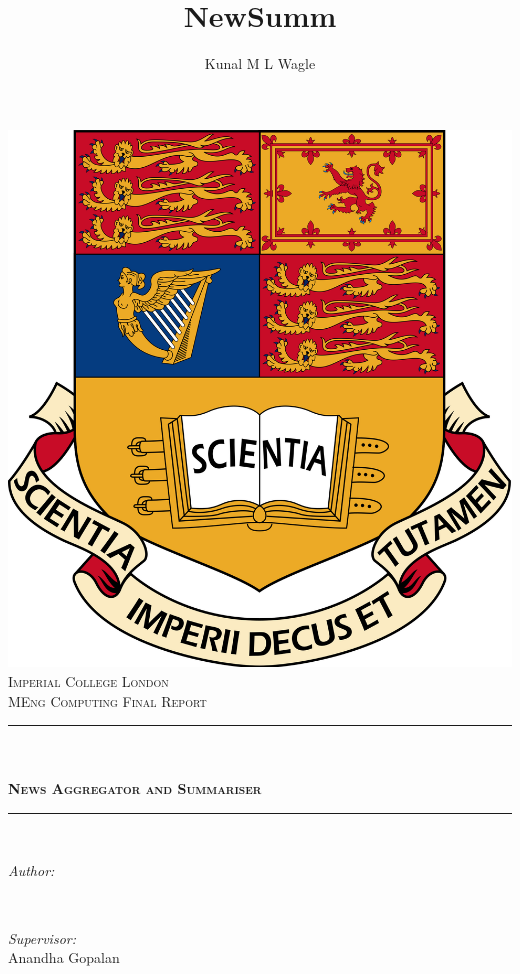 \documentclass[12pt]{article}
\title{NewSumm}								%
\author{Kunal M L Wagle}								%
\makeatletter
\let\thetitle\@title
\let\theauthor\@author
\makeatother
\begin{document}
\lstset{upquote=true}



\begin{titlepage}
	\centering
    \vspace*{0.5 cm}
    \includegraphics[scale = 0.05]{Imperial_College_London_crest.png}\\[1.0 cm]	%
    \textsc{\LARGE Imperial College London}\\[2.0 cm]	%
	\textsc{\large MEng Computing Final Report}\\[0.5 cm]				%
	\rule{\linewidth}{0.2 mm} \\[0.4 cm]
	{ \huge \bfseries \thetitle \\[0.4cm] \textsc{\large News Aggregator and Summariser}}\\
	\rule{\linewidth}{0.2 mm} \\[1.5 cm]
	
	\begin{minipage}{0.4\textwidth}
		\begin{flushleft} \large
			\emph{Author:}\\
			\theauthor
			\end{flushleft}
			\end{minipage}~
			\begin{minipage}{0.4\textwidth}
			\begin{flushright} \large
			\emph{Supervisor:} \\
			Anandha Gopalan									%
		\end{flushright}
	\end{minipage}\\[2 cm]
 
	\vfill
	
\end{titlepage}
\end{document}
